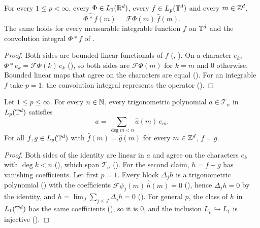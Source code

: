 \begin{theorem}
\label{thm:torus-coefficients-convolution}
\leanok
{}
For every $1 \leq p < \infty$, every $\Phi \in L_1(\mathbb{R}^d)$, every $f \in L_p(\mathbb{T}^d)$ and every
$m \in \mathbb{Z}^d$,
\[
  \widehat{\Phi * f}(m) = \mathcal{F}\Phi(m) \, \hat f(m) .
\]
The same holds for every measurable integrable function $f$ on $\mathbb{T}^d$ and the convolution
integral $\Phi * f$ of .
\end{theorem}

\begin{proof}
\leanok
Both sides are bounded linear functionals of $f$ (,
). On a character $e_k$,
$\Phi * e_k = \mathcal{F}\Phi(k) \, e_k$ (), so both sides are
$\mathcal{F}\Phi(m)$ for $k = m$ and $0$ otherwise. Bounded linear maps that agree on the
characters are equal (). For an integrable $f$ take $p = 1$:
the convolution integral represents the operator ().
\end{proof}

\begin{theorem}
\label{thm:torus-coefficients-uniqueness}
\leanok
{}
Let $1 \leq p \leq \infty$. For every $n \in \mathbb{N}$, every trigonometric polynomial
$a \in \mathcal{T}_n$ in $L_p(\mathbb{T}^d)$ satisfies
\[
  a = \sum_{\deg m < n} \hat a(m) \, e_m .
\]
For all $f, g \in L_p(\mathbb{T}^d)$ with $\hat f(m) = \hat g(m)$ for every $m \in \mathbb{Z}^d$, $f = g$.
\end{theorem}

\begin{proof}
\leanok
Both sides of the identity are linear in $a$ and agree on the characters $e_k$ with $\deg k < n$
(), which span $\mathcal{T}_n$ ().
For the second claim, $h = f - g$ has vanishing coefficients. Let first $p = 1$. Every block
$\Delta_j h$ is a trigonometric polynomial () with the
coefficients $\mathcal{F}\psi_j(m) \, \hat h(m) = 0$ (),
hence $\Delta_j h = 0$ by the identity, and $h = \lim_J \sum_{j \leq J} \Delta_j h = 0$
(). For general $p$, the class of $h$ in $L_1(\mathbb{T}^d)$ has the same
coefficients (), so it is $0$, and the inclusion
$L_p \hookrightarrow L_1$ is injective ().
\end{proof}

